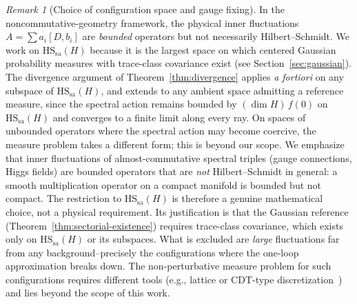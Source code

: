 \documentclass[12pt,a4paper]{article}
\theoremstyle{plain}
\theoremstyle{definition}
\theoremstyle{remark}
\newtheorem{remark}[theorem]{Remark}
\newcommand{\HS}{\mathrm{HS}}
\newcommand{\sa}{\mathrm{sa}}
\begin{document}
\begin{remark}[Choice of configuration space and gauge fixing]
\label{rem:HS-choice}
In the noncommutative-geometry framework, the physical inner
fluctuations $A = \sum a_i[D,b_i]$ are \emph{bounded} operators but
not necessarily Hilbert--Schmidt.  We work on $\HS_\sa(H)$ because
it is the largest space on which centered Gaussian probability measures
with trace-class covariance exist (see Section~\ref{sec:gaussian}).
The divergence argument of Theorem~\ref{thm:divergence} applies
\emph{a fortiori} on any subspace of $\HS_\sa(H)$, and extends to
any ambient space admitting a reference measure, since the spectral
action remains bounded by $(\dim H)\,f(0)$ on $\HS_\sa(H)$ and
converges to a finite limit along every ray.  On spaces of unbounded
operators where the spectral action may become coercive, the measure
problem takes a different form; this is beyond our scope.
We emphasize that inner fluctuations of almost-commutative spectral
triples (gauge connections, Higgs fields) are bounded operators that
are \emph{not} Hilbert--Schmidt in general: a smooth multiplication
operator on a compact manifold is bounded but not compact.
The restriction to $\HS_\sa(H)$ is therefore a genuine mathematical
choice, not a physical requirement.  Its justification is that the
Gaussian reference (Theorem~\ref{thm:sectorial-existence}) requires
trace-class covariance, which exists only on $\HS_\sa(H)$ or its
subspaces.  What is excluded
are \emph{large} fluctuations far from any background--precisely the
configurations where the one-loop approximation breaks down.
The non-perturbative measure problem for such configurations
requires different tools (e.g., lattice or CDT-type
discretization~\cite{AJL:2012}) and lies beyond the scope of this
work.


\end{remark}
\end{document}
